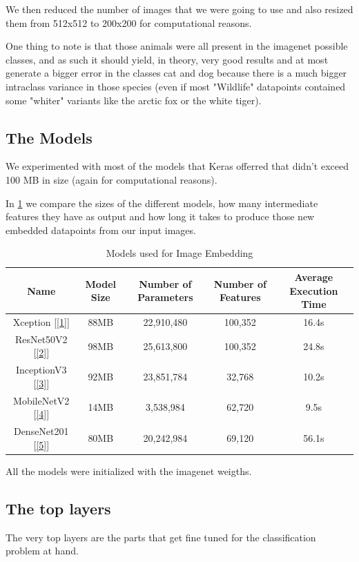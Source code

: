 \documentclass[conference]{IEEEtran}
\begin{document}
We then reduced the number of images that we were going to use and also resized them from 512x512 to
200x200 for computational reasons.

One thing to note is that those animals were all present in the imagenet possible classes, and as such it
should yield, in theory, very good results and at most generate a bigger error in the classes cat and dog because
there is a much bigger intraclass variance in those species (even if most "Wildlife" datapoints contained some 
"whiter" variants like the arctic fox or the white tiger).

\subsection{The Models}
We experimented with most of the models that Keras offerred that didn't exceed 100 MB in size (again for computational reasons).

In \ref{ModelTable} we compare the sizes of the different models, how many intermediate features they have as output 
and how long it takes to produce those new embedded datapoints from our input images. 

\begin{table}[htbp]
\caption{Models used for Image Embedding}
\begin{center}
\begin{tabular}{|c|c|c|c|c|}
\hline
\textbf{Name} &\textbf{Model Size} &\textbf{Number of Parameters} & \textbf{Number of Features} &\textbf{Average Execution Time}\\
\hline
\hline
Xception [\ref{1}] & 88MB & 22,910,480 & 100,352 &  16.4s\\
\hline
ResNet50V2 [\ref{2}] & 98MB & 25,613,800 & 100,352 & 24.8s\\
\hline
InceptionV3 [\ref{3}] & 92MB & 23,851,784 & 32,768 &  10.2s\\
\hline
MobileNetV2 [\ref{4}] & 14MB & 3,538,984 & 62,720  & 9.5s\\
\hline
DenseNet201 [\ref{5}] & 80MB & 20,242,984 & 69,120 & 56.1s\\
\hline
\end{tabular}
\label{ModelTable}
\end{center}
\end{table}

All the models were initialized with the imagenet weigths.

\subsection{The top layers}
The very top layers are the parts that get fine tuned for the classification problem at hand.
\end{document}
